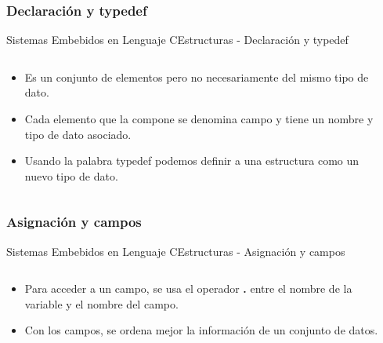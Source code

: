 \documentclass[aspectratio=169, xcolor=dvipsnames]{beamer}
\begin{document}
\subsubsection{Declaración y typedef}
\begin{frame}{Sistemas Embebidos en Lenguaje C}{Estructuras - Declaración y typedef}
\begin{columns}
    \begin{column}{0.5\textwidth}
        \begin{itemize}
            \item Es un conjunto de elementos pero no necesariamente del mismo tipo de dato.
            \item Cada elemento que la compone se denomina campo y tiene un nombre y tipo de dato asociado.
            \item Usando la palabra \textcolor{myblue}{typedef} podemos definir a una estructura como un nuevo tipo de dato.
        \end{itemize}
    \end{column}
    \begin{column}{0.5\textwidth}
        
    \end{column}
\end{columns}
\end{frame}

\subsubsection{Asignación y campos}
\begin{frame}{Sistemas Embebidos en Lenguaje C}{Estructuras - Asignación y campos}
\begin{columns}
    \begin{column}{0.5\textwidth}
        \begin{itemize}
            \item Para acceder a un campo, se usa el operador \textbf{.} entre el nombre de la variable y el nombre del campo.
            \item Con los campos, se ordena mejor la información de un conjunto de datos.
        \end{itemize}
    \end{column}
    \begin{column}{0.5\textwidth}
        
    \end{column}
\end{columns}
\end{frame}
\end{document}
